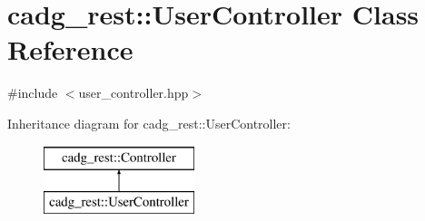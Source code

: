 \hypertarget{classcadg__rest_1_1_user_controller}{}\section{cadg\+\_\+rest\+::User\+Controller Class Reference}
\label{classcadg__rest_1_1_user_controller}


{\ttfamily \#include $<$user\+\_\+controller.\+hpp$>$}

Inheritance diagram for cadg\+\_\+rest\+::User\+Controller\+:\begin{figure}[H]
\begin{center}
\leavevmode
\includegraphics[height=2.000000cm]{classcadg__rest_1_1_user_controller}
\end{center}
\end{figure}
